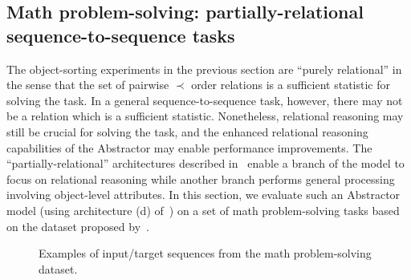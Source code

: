 \subsection{Math problem-solving: partially-relational sequence-to-sequence tasks}\label{ssec:experiments_math}

The object-sorting experiments in the previous section are ``purely relational'' in the sense that the set of pairwise $\prec$ order relations is a sufficient statistic for solving the task.
In a general sequence-to-sequence task, however, there may not be a relation which is a sufficient statistic. Nonetheless, relational reasoning may still be crucial for solving the task, and the enhanced relational reasoning capabilities of the Abstractor may enable performance improvements. The ``partially-relational'' architectures described in~ enable a branch of the model to focus on relational reasoning while another branch performs general processing involving object-level attributes. In this section, we evaluate such an Abstractor model (using architecture (d) of~) on a set of math problem-solving tasks based on the dataset proposed by~\citet{saxtonAnalyzingMathematicalReasoning2019}.

\begin{figure}
    \vskip-10pt
    \begin{center}
    \end{center}
    \vskip-10pt
    \caption{Examples of input/target sequences from the math problem-solving dataset.}\label{fig:math_dataset}
    \vskip-15pt
\end{figure}

